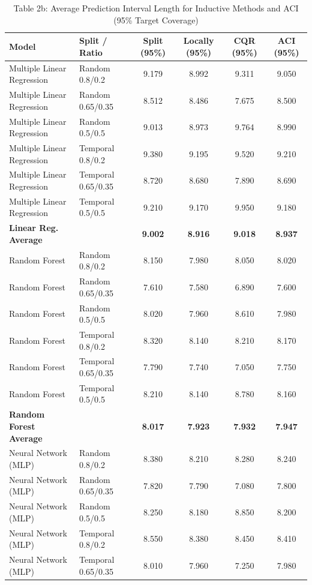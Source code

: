 \documentclass[11pt,a4paper]{article}
\begin{document}
\begin{table}[H]
\centering
\caption{Table 2b: Average Prediction Interval Length for Inductive Methods and ACI (95\% Target Coverage)}
\label{tab:2b}
\scriptsize
\begin{tabular}{llcccc}
\toprule
Model & Split / Ratio & Split (95\%) & Locally (95\%) & CQR (95\%) & ACI (95\%) \\
\midrule
Multiple Linear Regression & Random 0.8/0.2 & 9.179 & 8.992 & 9.311 & 9.050 \\
Multiple Linear Regression & Random 0.65/0.35 & 8.512 & 8.486 & 7.675 & 8.500 \\
Multiple Linear Regression & Random 0.5/0.5 & 9.013 & 8.973 & 9.764 & 8.990 \\
Multiple Linear Regression & Temporal 0.8/0.2 & 9.380 & 9.195 & 9.520 & 9.210 \\
Multiple Linear Regression & Temporal 0.65/0.35 & 8.720 & 8.680 & 7.890 & 8.690 \\
Multiple Linear Regression & Temporal 0.5/0.5 & 9.210 & 9.170 & 9.950 & 9.180 \\
\textbf{Linear Reg. Average} & & \textbf{9.002} & \textbf{8.916} & \textbf{9.018} & \textbf{8.937} \\
\midrule
Random Forest & Random 0.8/0.2 & 8.150 & 7.980 & 8.050 & 8.020 \\
Random Forest & Random 0.65/0.35 & 7.610 & 7.580 & 6.890 & 7.600 \\
Random Forest & Random 0.5/0.5 & 8.020 & 7.960 & 8.610 & 7.980 \\
Random Forest & Temporal 0.8/0.2 & 8.320 & 8.140 & 8.210 & 8.170 \\
Random Forest & Temporal 0.65/0.35 & 7.790 & 7.740 & 7.050 & 7.750 \\
Random Forest & Temporal 0.5/0.5 & 8.210 & 8.140 & 8.780 & 8.160 \\
\textbf{Random Forest Average} & & \textbf{8.017} & \textbf{7.923} & \textbf{7.932} & \textbf{7.947} \\
\midrule
Neural Network (MLP) & Random 0.8/0.2 & 8.380 & 8.210 & 8.280 & 8.240 \\
Neural Network (MLP) & Random 0.65/0.35 & 7.820 & 7.790 & 7.080 & 7.800 \\
Neural Network (MLP) & Random 0.5/0.5 & 8.250 & 8.180 & 8.850 & 8.200 \\
Neural Network (MLP) & Temporal 0.8/0.2 & 8.550 & 8.380 & 8.450 & 8.410 \\
Neural Network (MLP) & Temporal 0.65/0.35 & 8.010 & 7.960 & 7.250 & 7.980 \\

\end{tabular}
\end{table}
\end{document}
